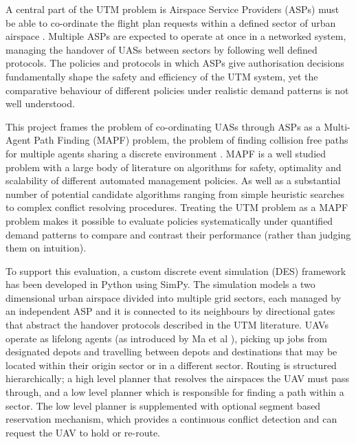 A central part of the UTM problem is Airspace Service Providers (ASPs) must be able to co-ordinate the flight plan requests within a defined sector of urban airspace \cite{kopardekar2014utm, faa2020utmconops}. Multiple ASPs are expected to operate at once in a networked system, managing the handover of UASs between sectors by following well defined protocols. The policies and protocols in which ASPs give authorisation decisions fundamentally shape the safety and efficiency of the UTM system, yet the comparative behaviour of different policies under realistic demand patterns is not well understood. \par

\vspace{1em}

This project frames the problem of co-ordinating UASs through ASPs as a Multi-Agent Path Finding (MAPF) problem, the problem of finding collision free paths for multiple agents sharing a discrete environment \cite{stern2019multi}. MAPF is a well studied problem with a large body of literature on algorithms for safety, optimality and scalability of different automated management policies. As well as a substantial number of potential candidate algorithms ranging from simple heuristic searches to complex conflict resolving procedures. Treating the UTM problem as a MAPF problem makes it possible to evaluate policies systematically under quantified demand patterns to compare and contrast their performance (rather than judging them on intuition). \par

\vspace{1em}

To support this evaluation, a custom discrete event simulation (DES) framework has been developed in Python using SimPy. The simulation models a two dimensional urban airspace divided into multiple grid sectors, each managed by an independent ASP and it is connected to its neighbours by directional gates that abstract the handover protocols described in the UTM literature. UAVs operate as lifelong agents (as introduced by Ma et al \cite{ma2017lifelong}), picking up jobs from designated depots and travelling between depots and destinations that may be located within their origin sector or in a different sector. Routing is structured hierarchically; a high level planner that resolves the airspaces the UAV must pass through, and a low level planner which is responsible for finding a path within a sector. The low level planner is supplemented with optional segment based reservation mechanism, which provides a continuous conflict detection and can request the UAV to hold or re-route. \par

